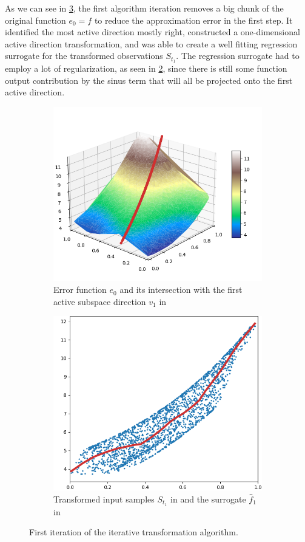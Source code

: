 \documentclass[
  a4paper,  %
  twoside,  %
  bibliography=totoc,
  headsepline,
  cleardoublepage=empty,
  parskip=half,
  draft=false
]{scrbook}
\begin{document}
\noindent
As we can see in \cref{fig:pipeline_1}, the first algorithm iteration removes a big chunk of the original function $e_0=f$ to reduce the approximation error in the first step.
It identified the most active direction mostly right, constructed a one-dimensional active direction transformation, and was able to create a well fitting regression surrogate for the transformed observations $S_{t_1}$.
The regression surrogate had to employ a lot of regularization, as seen in \cref{fig:pipeline_local_1}, since there is still some function output contribution by the sinus term that will all be projected onto the first active direction.
\begin{mdframed}[style=style]
\begin{figure}[H]
\begin{subfigure}{.5\textwidth}
  \centering
  \includegraphics[width=.8\linewidth]{graphics/pipeline_current_1.png}
  \caption{Error function $e_0$ and its intersection with the first active subspace direction $v_1$ in \reddot}
\label{fig:pipeline_current_1}
\end{subfigure}%
\begin{subfigure}{.5\textwidth}
  \centering
  \includegraphics[width=.8\linewidth]{graphics/pipeline_local_1.png}
  \caption{Transformed input samples $S_{t_1}$ in \blue and the surrogate $\hat{f}_1$ in \reddot}
\label{fig:pipeline_local_1}
\end{subfigure}
\delimit
\caption{First iteration of the iterative transformation algorithm.}
\label{fig:pipeline_1}
\end{figure}
\end{mdframed}
\end{document}
